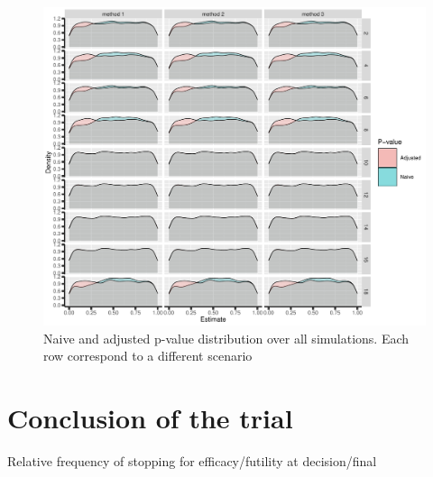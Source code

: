 \documentclass[12pt]{article}
\begin{document}
\clearpage

\begin{figure}[!h]
\centering
\includegraphics[trim={0 0 0 0},width=1\textwidth]{./figures/gg-pvalue-density.pdf}
\caption{Naive and adjusted p-value distribution over all simulations. Each row correspond to a different scenario}
\end{figure}

\clearpage

\section{Conclusion of the trial}
\label{sec:org6b2572b}

Relative frequency of stopping for efficacy/futility at decision/final
\end{document}
